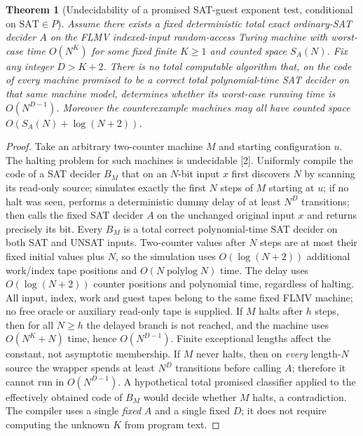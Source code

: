 \documentclass[11pt]{article}
\newtheorem{theorem}{Theorem}
\begin{document}
\begin{theorem}[Undecidability of a promised SAT-guest exponent test, conditional on $\mathrm{SAT}\in P$]
Assume there exists a fixed deterministic total exact ordinary-SAT decider $A$ on the FLMV indexed-input random-access Turing machine with worst-case time $O(N^K)$ for some fixed finite $K\ge1$ and counted space $S_A(N)$. Fix any integer $D>K+2$. There is no total computable algorithm that, on the code of every machine \emph{promised} to be a correct total polynomial-time SAT decider on that same machine model, determines whether its worst-case running time is $O(N^{D-1})$. Moreover the counterexample machines may all have counted space $O(S_A(N)+\log(N+2))$.
\end{theorem}
\begin{proof}
Take an arbitrary two-counter machine $M$ and starting configuration $u$. The halting problem for such machines is undecidable [2]. Uniformly compile the code of a SAT decider $B_M$ that on an $N$-bit input $x$ first discovers $N$ by scanning its read-only source; simulates exactly the first $N$ steps of $M$ starting at $u$; if no halt was seen, performs a deterministic dummy delay of at least $N^D$ transitions; then calls the fixed SAT decider $A$ on the unchanged original input $x$ and returns precisely its bit. Every $B_M$ is a total correct polynomial-time SAT decider on both SAT and UNSAT inputs. Two-counter values after $N$ steps are at most their fixed initial values plus $N$, so the simulation uses $O(\log(N+2))$ additional work/index tape positions and $O(N\operatorname{polylog}N)$ time. The delay uses $O(\log(N+2))$ counter positions and polynomial time, regardless of halting. All input, index, work and guest tapes belong to the same fixed FLMV machine; no free oracle or auxiliary read-only tape is supplied.
If $M$ halts after $h$ steps, then for all $N\ge h$ the delayed branch is not reached, and the machine uses $O(N^K+N)$ time, hence $O(N^{D-1})$. Finite exceptional lengths affect the constant, not asymptotic membership. If $M$ never halts, then on \emph{every} length-$N$ source the wrapper spends at least $N^D$ transitions before calling $A$; therefore it cannot run in $O(N^{D-1})$. A hypothetical total promised classifier applied to the effectively obtained code of $B_M$ would decide whether $M$ halts, a contradiction. The compiler uses a single \emph{fixed} $A$ and a single fixed $D$; it does not require computing the unknown $K$ from program text.
\end{proof}
\end{document}
